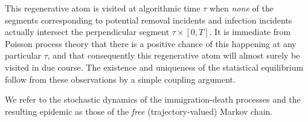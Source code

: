\documentclass[]{article}
\begin{document}
This regenerative atom is visited at algorithmic time \(\tau\)
when \emph{none} of the segments corresponding to
potential removal incidents
and infection incidents actually intersect
the perpendicular segment
\(\tau\times[0,T]\). 
It is immediate from Poisson process theory
that there is a positive chance of this happening at any particular
\(\tau\),
and that
consequently this regenerative 
 atom will almost surely be visited in
 due course.
 The existence
 and uniqueness of the statistical equilibrium 
 follow 
 from these observations
 by a simple coupling argument.

 We refer to the stochastic dynamics of the immigration-death processes and the resulting
 epidemic
 as those of the \emph{free} 
 (trajectory-valued) Markov chain.
\end{document}

